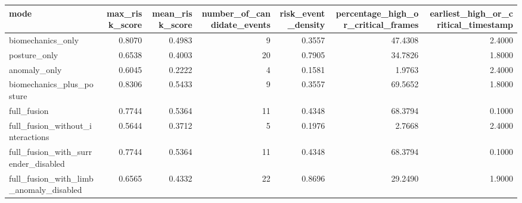 \begin{tabular}{lrrrrrr}
\toprule
mode & max\_risk\_score & mean\_risk\_score & number\_of\_candidate\_events & risk\_event\_density & percentage\_high\_or\_critical\_frames & earliest\_high\_or\_critical\_timestamp \\
\midrule
biomechanics\_only & 0.8070 & 0.4983 & 9 & 0.3557 & 47.4308 & 2.4000 \\
posture\_only & 0.6538 & 0.4003 & 20 & 0.7905 & 34.7826 & 1.8000 \\
anomaly\_only & 0.6045 & 0.2222 & 4 & 0.1581 & 1.9763 & 2.4000 \\
biomechanics\_plus\_posture & 0.8306 & 0.5433 & 9 & 0.3557 & 69.5652 & 1.8000 \\
full\_fusion & 0.7744 & 0.5364 & 11 & 0.4348 & 68.3794 & 0.1000 \\
full\_fusion\_without\_interactions & 0.5644 & 0.3712 & 5 & 0.1976 & 2.7668 & 2.4000 \\
full\_fusion\_with\_surrender\_disabled & 0.7744 & 0.5364 & 11 & 0.4348 & 68.3794 & 0.1000 \\
full\_fusion\_with\_limb\_anomaly\_disabled & 0.6565 & 0.4332 & 22 & 0.8696 & 29.2490 & 1.9000 \\
\bottomrule
\end{tabular}
